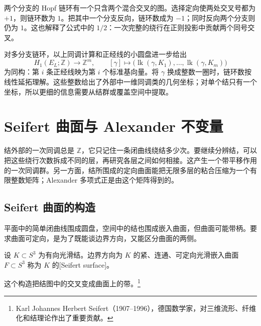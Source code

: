 \begin{example}\label{g2:exm:hopf-linking}
	两个分支的 Hopf 链环有一个只含两个混合交叉的图。选择定向使两处交叉号都为 \(+1\)，则链环数为 \(1\)。把其中一个分支反向，链环数成为 \(-1\)；同时反向两个分支则仍为 \(1\)。这也解释了公式中的 \(1/2\)：一次完整的绕行在正则投影中贡献两个同号交叉。
\end{example}

对多分支链环，以上同调计算和正经线的小圆盘进一步给出
\[
	H_1(E_L;\mathbb Z)\longrightarrow\mathbb Z^m,
	\qquad [\gamma]\longmapsto
	\bigl(\operatorname{lk}(\gamma,K_1),\ldots,\operatorname{lk}(\gamma,K_m)\bigr)
\]
为同构：第 \(i\) 条正经线映为第 \(i\) 个标准基向量。将 \(\gamma\) 换成整数一圈时，链环数按线性延拓理解。这些整数给出了外部中一维同调类的几何坐标；对单个结只有一个坐标，所以更细的信息需要从结群或覆盖空间中提取。

\section{Seifert 曲面与 Alexander 不变量}
\label{g2:sec:A02}

结外部的一次同调总是 \(\mathbb Z\)，它只记住一条闭曲线绕结多少次。要继续分辨结，可以把这些绕行次数拆成不同的层，再研究各层之间如何相接。这产生一个带平移作用的一次同调群。另一方面，结所围成的定向曲面能把无限多层的粘合压缩为一个有限整数矩阵；Alexander 多项式正是由这个矩阵得到的。

\subsection{Seifert 曲面的构造}
\label{g2:subsec:A02:01}

平面中的简单闭曲线围成圆盘，空间中的结也围成嵌入曲面，但曲面可能带柄。要求曲面可定向，是为了既能谈边界方向，又能区分曲面的两侧。

\begin{definition}\label{g2:def:seifert-surface}
	设 \(K\subset S^3\) 为有向光滑结。边界方向为 \(K\) 的紧、连通、可定向光滑嵌入曲面 \(F\subset S^3\) 称为 \(K\) 的[Seifert surface]。
\end{definition}
这个构造把结图中的交叉变成曲面上的带。\footnote{Karl Johannes Herbert Seifert（1907--1996），德国数学家，对三维流形、纤维化和结理论作出了重要贡献。}


